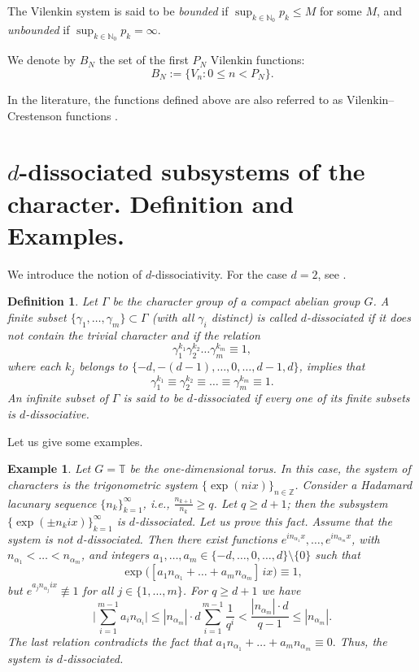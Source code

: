 \documentclass[12pt]{article}
\newtheorem{exmpl}{Example}
\newtheorem{definition}{Definition}
\begin{document}
The Vilenkin system is said to be \textit{bounded} if $\sup_{k \in \mathbb{N}_0} p_k \le M$ for some $M$, and \textit{unbounded} if $\sup_{k \in \mathbb{N}_0} p_k = \infty$.

We denote by $B_N$ the set of the first $P_N$ Vilenkin functions:
\begin{equation} \label{B_N}
	B_N := \{V_n : 0 \le n < P_N\}.
\end{equation} 

In the literature, the functions defined above are also referred to as Vilenkin--Crestenson functions \cite{Malozemov-Masharskii-2001}.

	
	\section{ $d$-dissociated subsystems of the character. Definition and Examples.} \label{section-1}
	
	We introduce the notion of $d$-dissociativity. For the case $d=2$, see \cite[(37.12)]{HewRoss}.
	
	\begin{definition} \label{dissociate}
		Let $\Gamma$ be the character group of a compact abelian group $G$. A finite subset $\{\gamma_1, \ldots, \gamma_m\} \subset \Gamma$ (with all $\gamma_i$ distinct) is called $d$-dissociated if it does not contain the trivial character and if the relation
		\[
		\gamma_1^{k_1} \gamma_{2}^{k_2} \dots \gamma_{m}^{k_m} \equiv 1,
		\]
		where each $k_j$ belongs to $\{-d, -(d-1), \ldots, 0, \ldots, d-1, d\}$, implies that
		\[
		\gamma_1^{k_1} \equiv \gamma_{2}^{k_2} \equiv \ldots \equiv \gamma_{m}^{k_m} \equiv 1.
		\]
		An infinite subset of $\Gamma$ is said to be $d$-dissociated if every one of its finite subsets is $d$-dissociative.
	\end{definition}
	
	Let us give some examples.
	\begin{exmpl}
		Let $G = \mathbb{T}$ be the one-dimensional torus. In this case, the system of characters is the trigonometric system $\{\exp(nix)\}_{n\in \mathbb{Z}}$. Consider a Hadamard lacunary sequence $\{n_k\}_{k=1}^{\infty}$, i.e., $\frac{n_{k+1}}{n_k} \ge q$. Let $q \ge d+1$; then the subsystem $\{\exp(\pm n_kix)\}_{k=1}^{\infty}$ is $d$-dissociated. Let us prove this fact. Assume that the system is not $d$-dissociated. Then there exist functions $e^{in_{\alpha_1} x}, \ldots, e^{in_{\alpha_m} x}$, with $n_{\alpha_1} < \ldots < n_{\alpha_m}$, and integers $a_1, \ldots, a_m \in \{-d, \ldots, 0, \ldots, d\} \setminus \{0\}$ such that
		\[
		\exp\bigl([a_1 n_{\alpha_1} + \ldots + a_m n_{\alpha_m}]\, i x\bigr) \equiv 1,
		\]
		but $e^{a_j n_{\alpha_j} i x} \not\equiv 1$ for all $j \in \{1, \ldots, m\}$.
		For $q \geq d+1$ we have
		\[
		\biggl|\sum_{i=1}^{m-1} a_i n_{\alpha_i}\biggr| 
		\leq |n_{\alpha_m}| \cdot d \sum_{i=1}^{m-1} \frac{1}{q^i} 
		< \frac{|n_{\alpha_m}| \cdot d}{q-1} \le |n_{\alpha_m}|.
		\]
		The last relation contradicts the fact that $a_1 n_{\alpha_1} + \ldots + a_m n_{\alpha_m} \equiv 0.$ Thus, the system is $d$-dissociated.
	\end{exmpl}
	
\end{document}
